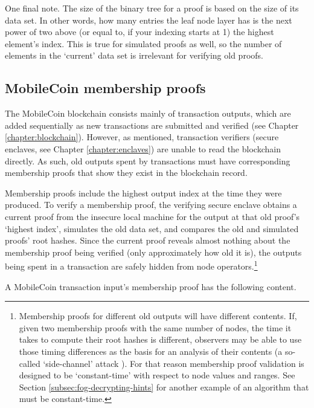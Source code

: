 One final note. The size of the binary tree for a proof is based on the size of its data set. In other words, how many entries the leaf node layer has is the next power of two above (or equal to, if your indexing starts at 1) the highest element's index. This is true for simulated proofs as well, so the number of elements in the `current' data set is irrelevant for verifying old proofs.


\subsection{MobileCoin membership proofs}
\label{subsec:mobilecoin-membership-proofs}

The MobileCoin blockchain consists mainly of transaction outputs, which are added sequentially as new transactions are submitted and verified (see Chapter \ref{chapter:blockchain}). However, as mentioned, transaction verifiers (secure enclaves, see Chapter \ref{chapter:enclaves}) are unable to read the blockchain directly. As such, old outputs spent by transactions must have corresponding membership proofs that show they exist in the blockchain record.

Membership proofs include the highest output index at the time they were produced. To verify a membership proof, the verifying secure enclave obtains a current proof from the insecure local machine for the output at that old proof's `highest index', simulates the old data set, and compares the old and simulated proofs' root hashes. Since the current proof reveals almost nothing about the membership proof being verified (only approximately how old it is), the outputs being spent in a transaction are safely hidden from node operators.\footnote{Membership proofs for different old outputs will have different contents. If, given two membership proofs with the same number of nodes, the time it takes to compute their root hashes is different, observers may be able to use those timing differences as the basis for an analysis of their contents (a so-called `side-channel' attack \cite{nist-side-channel-attack-def}). For that reason membership proof validation is designed to be `constant-time' with respect to node values and ranges. See Section \ref{subsec:fog-decrypting-hints} for another example of an algorithm that must be constant-time.}

A MobileCoin transaction input's membership proof has the following content.

